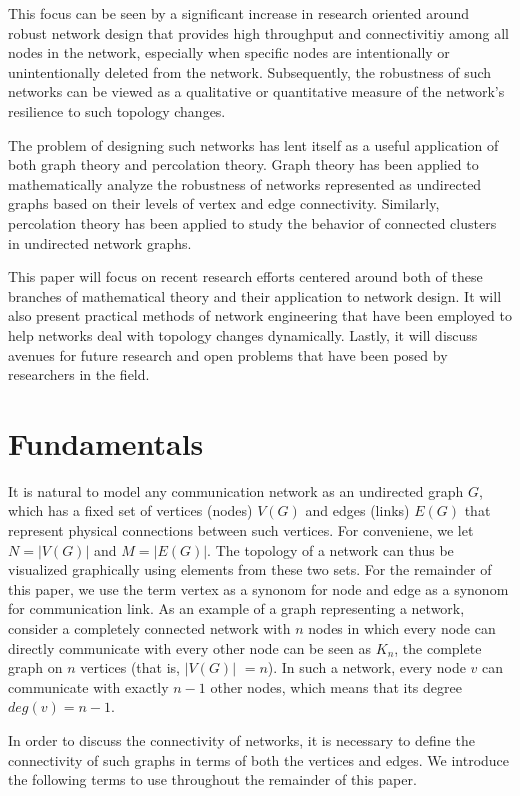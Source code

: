 \documentclass[11pt]{article}
\begin{document}
This focus can be seen by a significant increase in research oriented around robust network design that provides high throughput and connectivitiy among all nodes in the network, especially when specific nodes are intentionally or unintentionally deleted from the network. Subsequently, the robustness of such networks can be viewed as a qualitative or quantitative measure of the network's resilience to such topology changes.

The problem of designing such networks has lent itself as a useful application of both graph theory and percolation theory. Graph theory has been applied to mathematically analyze the robustness of networks represented as undirected graphs based on their levels of vertex and edge connectivity. Similarly, percolation theory has been applied to study the behavior of connected clusters in undirected network graphs. 

This paper will focus on recent research efforts centered around both of these branches of 
mathematical theory and their application to network design. It will also present practical methods of
network engineering that have been employed to help networks deal with topology changes dynamically.
Lastly, it will discuss avenues for future research and open problems that have been posed by 
researchers in the field.

\section{Fundamentals}

It is natural to model any communication network as an undirected graph $G$, which has a fixed 
set of vertices (nodes) $V(G)$ and edges (links) $E(G)$ that represent physical connections between such vertices. For conveniene, we let $N = |V(G)|$ and $M = |E(G)|$. The topology of a network
can thus be visualized graphically using elements from these two sets. For the remainder of this paper,
we use the term vertex as a synonom for node and edge as a synonom for communication link. As an example of a graph representing a network, consider a completely connected network with $n$ nodes in which every node can directly communicate with every other 
node can be seen as $K_{n}$, the complete graph on $n$ vertices (that is, $|V(G)|$ $= n$). In such a network, every node $v$ can
communicate with exactly $n-1$ other nodes, which means that its degree $deg(v) = n-1$. 

In order to discuss the connectivity of networks, it is necessary to define the connectivity of such
graphs in terms of both the vertices and edges. We introduce the following terms to use throughout 
the remainder of this paper.
\end{document}
